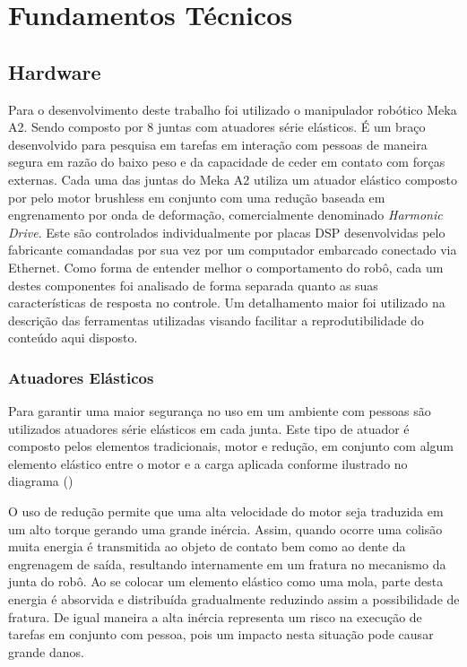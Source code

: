 \chapter{Fundamentos Técnicos}

\section{Hardware}

Para o desenvolvimento deste trabalho foi utilizado o manipulador robótico Meka A2. Sendo composto por 8 juntas com atuadores série elásticos. É um braço desenvolvido para pesquisa em tarefas em interação com pessoas de maneira segura em razão do baixo peso e da capacidade de ceder em contato com forças externas. 
Cada uma das juntas do Meka A2 utiliza um atuador elástico composto por pelo motor brushless em conjunto com uma redução baseada em engrenamento por onda de deformação, comercialmente denominado \textit{Harmonic Drive}. Este são controlados individualmente por placas DSP desenvolvidas pelo fabricante comandadas por sua vez por um computador embarcado conectado via Ethernet. Como forma de entender melhor o comportamento do robô, cada um destes componentes foi analisado de forma separada quanto as suas características de resposta no controle. Um detalhamento maior foi utilizado na descrição das ferramentas utilizadas visando facilitar a reprodutibilidade do conteúdo aqui disposto.

\subsection{Atuadores Elásticos}

Para garantir uma maior segurança no uso em um ambiente com pessoas são utilizados atuadores série elásticos em cada junta. Este tipo de atuador é composto pelos elementos tradicionais, motor e redução, em conjunto com algum elemento elástico entre o motor e a carga aplicada conforme ilustrado no diagrama ()


O uso de redução permite que uma alta velocidade do motor seja traduzida em um alto torque gerando uma grande inércia. Assim, quando ocorre uma colisão muita energia é transmitida ao objeto de contato bem como ao dente da engrenagem de saída, resultando internamente em um fratura no mecanismo da junta do robô. Ao se colocar um elemento elástico como uma mola, parte desta energia é absorvida e distribuída gradualmente reduzindo assim a possibilidade de fratura. De igual maneira a alta inércia representa um risco na execução de tarefas em conjunto com pessoa, pois um impacto nesta situação pode causar grande danos.

